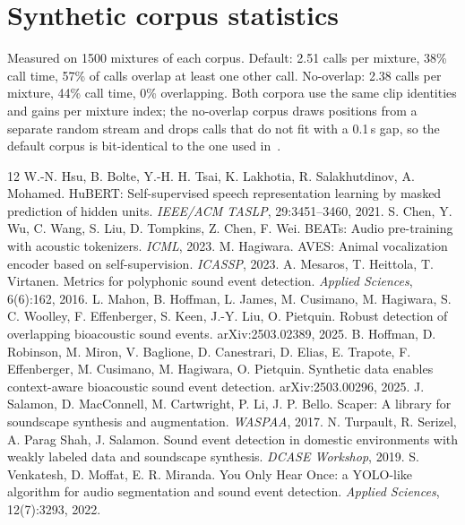 \documentclass[10pt,twocolumn]{article}
\begin{document}
\section{Synthetic corpus statistics}
Measured on 1500 mixtures of each corpus. Default: 2.51 calls per mixture, 38\% call time, 57\% of calls overlap at least one other call. No-overlap: 2.38 calls per mixture, 44\% call time, 0\% overlapping. Both corpora use the same clip identities and gains per mixture index; the no-overlap corpus draws positions from a separate random stream and drops calls that do not fit with a 0.1\,s gap, so the default corpus is bit-identical to the one used in~\citep{sheipak2026what}.


\begin{thebibliography}{12}
 W.-N. Hsu, B. Bolte, Y.-H. H. Tsai, K. Lakhotia, R. Salakhutdinov, A. Mohamed. HuBERT: Self-supervised speech representation learning by masked prediction of hidden units. \emph{IEEE/ACM TASLP}, 29:3451--3460, 2021.
 S. Chen, Y. Wu, C. Wang, S. Liu, D. Tompkins, Z. Chen, F. Wei. BEATs: Audio pre-training with acoustic tokenizers. \emph{ICML}, 2023.
 M. Hagiwara. AVES: Animal vocalization encoder based on self-supervision. \emph{ICASSP}, 2023.
 A. Mesaros, T. Heittola, T. Virtanen. Metrics for polyphonic sound event detection. \emph{Applied Sciences}, 6(6):162, 2016.
 L. Mahon, B. Hoffman, L. James, M. Cusimano, M. Hagiwara, S. C. Woolley, F. Effenberger, S. Keen, J.-Y. Liu, O. Pietquin. Robust detection of overlapping bioacoustic sound events. arXiv:2503.02389, 2025.
 B. Hoffman, D. Robinson, M. Miron, V. Baglione, D. Canestrari, D. Elias, E. Trapote, F. Effenberger, M. Cusimano, M. Hagiwara, O. Pietquin. Synthetic data enables context-aware bioacoustic sound event detection. arXiv:2503.00296, 2025.
 J. Salamon, D. MacConnell, M. Cartwright, P. Li, J. P. Bello. Scaper: A library for soundscape synthesis and augmentation. \emph{WASPAA}, 2017.
 N. Turpault, R. Serizel, A. Parag Shah, J. Salamon. Sound event detection in domestic environments with weakly labeled data and soundscape synthesis. \emph{DCASE Workshop}, 2019.
 S. Venkatesh, D. Moffat, E. R. Miranda. You Only Hear Once: a YOLO-like algorithm for audio segmentation and sound event detection. \emph{Applied Sciences}, 12(7):3293, 2022.

\end{thebibliography}
\end{document}
